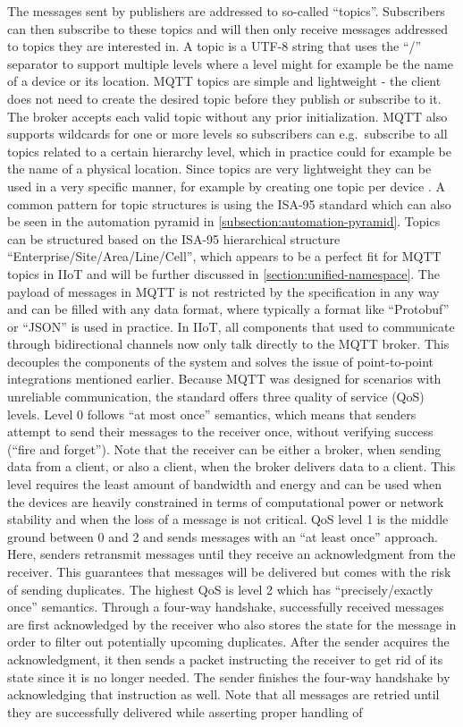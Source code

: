         The messages sent by publishers are addressed to so-called ``topics''. Subscribers can then subscribe to these topics and will then only receive messages addressed to topics they are interested in. A topic is a UTF-8 string that uses the ``/'' separator to support multiple levels where a level might for example be the name of a device or its location. MQTT topics are simple and lightweight - the client does not need to create the desired topic before they publish or subscribe to it. The broker accepts each valid topic without any prior initialization. MQTT also supports wildcards for one or more levels so subscribers can e.g.\ subscribe to all topics related to a certain hierarchy level, which in practice could for example be the name of a physical location. Since topics are very lightweight they can be used in a very specific manner, for example by creating one topic per device \cite{mqtt_topics_best_practices}. A common pattern for topic structures is using the ISA-95 standard which can also be seen in the automation pyramid in \autoref{subsection:automation-pyramid}. Topics can be structured based on the ISA-95 hierarchical structure ``Enterprise/Site/Area/Line/Cell'', which appears to be a perfect fit for MQTT topics in IIoT and will be further discussed in \autoref{section:unified-namespace}. The payload of messages in MQTT is not restricted by the specification in any way and can be filled with any data format, where typically a format like ``Protobuf'' or ``JSON'' is used in practice. In IIoT, all components that used to communicate through bidirectional channels now only talk directly to the MQTT broker. This decouples the components of the system and solves the issue of point-to-point integrations mentioned earlier. Because MQTT was designed for scenarios with unreliable communication, the standard offers three quality of service (QoS) levels. Level 0 follows ``at most once'' semantics, which means that senders attempt to send their messages to the receiver once, without verifying success (``fire and forget''). Note that the receiver can be either a broker, when sending data from a client, or also a client, when the broker delivers data to a client. This level requires the least amount of bandwidth and energy and can be used when the devices are heavily constrained in terms of computational power or network stability and when the loss of a message is not critical. QoS level 1 is the middle ground between 0 and 2 and sends messages with an ``at least once'' approach. Here, senders retransmit messages until they receive an acknowledgment from the receiver. This guarantees that messages will be delivered but comes with the risk of sending duplicates. The highest QoS is level 2 which has ``precisely/exactly once'' semantics. Through a four-way handshake, successfully received messages are first acknowledged by the receiver who also stores the state for the message in order to filter out potentially upcoming duplicates. After the sender acquires the acknowledgment, it then sends a packet instructing the receiver to get rid of its state since it is no longer needed. The sender finishes the four-way handshake by acknowledging that instruction as well. Note that all messages are retried until they are successfully delivered while asserting proper handling of 